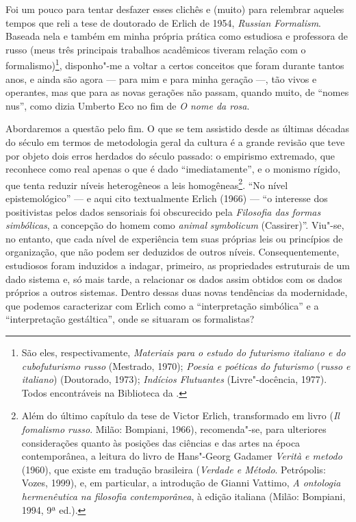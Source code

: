 {{{Foi um pouco para tentar desfazer esses clichês e (muito) para relembrar aqueles tempos
que reli a tese de doutorado de Erlich de 1954, \emph{Russian
Formalism}. Baseada nela e também em minha própria prática como
estudiosa e professora de russo (meus três principais trabalhos
acadêmicos tiveram relação com o formalismo)\footnote{São eles,
  respectivamente, \emph{Materiais para o estudo do futurismo italiano e
  do cubofuturismo russo} (Mestrado, 1970); \emph{Poesia e poéticas do
  futurismo} (\emph{russo e italiano}) (Doutorado, 1973); \emph{Indícios
  Flutuantes} (Livre"-docência, 1977). Todos encontráveis na Biblioteca
  da .}, disponho"-me a voltar a certos conceitos que foram durante
tantos anos, e ainda são agora --- para mim e para minha geração ---, tão
vivos e operantes, mas que para as novas gerações não passam, quando
muito, de ``nomes nus'', como dizia Umberto Eco no fim de \emph{O nome
da rosa}.



Abordaremos a questão pelo fim. O que se tem assistido desde as últimas
décadas do século  em termos de metodologia geral da cultura é a
grande revisão que teve por objeto dois erros herdados do século
passado: o empirismo extremado, que reconhece como real apenas o que é
dado ``imediatamente'', e o monismo rígido, que tenta reduzir níveis
heterogêneos a leis homogêneas\footnote{Além do último capítulo da
  tese de Victor Erlich, transformado em livro (\emph{Il fomalismo
  russo}. Milão: Bompiani, 1966), recomenda"-se, para ulteriores
  considerações quanto às posições das ciências e das
  artes na época contemporânea, a leitura do livro de Hans"-Georg Gadamer
  \emph{Verità e metodo} (1960), que existe em tradução brasileira
  (\emph{Verdade e Método}. Petrópolis: Vozes, 1999), e, em particular, a introdução
  de Gianni Vattimo, \emph{A ontologia hermenêutica na filosofia contemporânea}, à edição italiana (Milão: Bompiani, 1994, 
9ª ed.).}. ``No nível epistemológico'' --- e aqui cito textualmente Erlich (1966) --- ``o interesse dos
positivistas pelos dados sensoriais foi obscurecido pela \emph{Filosofia
das formas simbólicas}, a concepção do homem como \emph{animal}
\emph{symbolicum} (Cassirer)''.
Viu"-se, no entanto, que cada nível de experiência tem suas próprias leis ou
princípios de organização, que não podem ser deduzidos de outros níveis.
Consequentemente, estudiosos foram induzidos a indagar, primeiro, as
propriedades estruturais de um dado sistema e, só mais tarde, a
relacionar os dados assim obtidos com os dados próprios a outros
sistemas. Dentro dessas duas novas tendências da modernidade, que
podemos caracterizar com Erlich como a ``interpretação simbólica'' e a
``interpretação gestáltica'', onde se situaram os formalistas?

}}}
